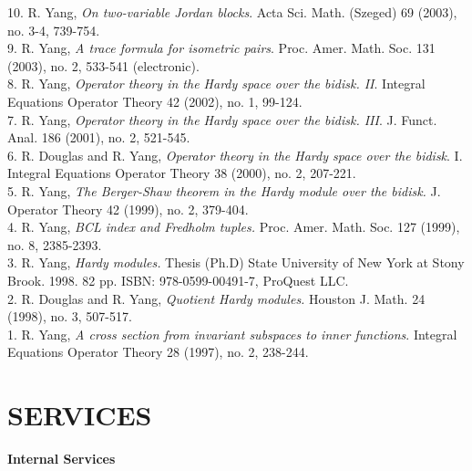 \documentclass[12pt]{res} %
\begin{document}
\begin{resume}
10. R. Yang, {\em On two-variable Jordan blocks}. Acta Sci. Math. (Szeged) 69 (2003), no. 3-4, 739-754.\\
9. R. Yang, {\em A trace formula for isometric pairs}. Proc. Amer. Math. Soc. 131 (2003), no. 2, 533-541 (electronic).\\
8. R. Yang, {\em Operator theory in the Hardy space over the bidisk. II}. Integral Equations Operator Theory 42 (2002), no. 1, 99-124.\\
7. R. Yang, {\em Operator theory in the Hardy space over the bidisk. III}. J. Funct. Anal. 186 (2001), no. 2, 521-545.\\
6. R. Douglas and {R. Yang}, {\em Operator theory in the Hardy space over the bidisk}. I. Integral Equations Operator Theory 38 (2000), no. 2, 207-221.\\
5. R. Yang, {\em The Berger-Shaw theorem in the Hardy module over the bidisk.} J. Operator Theory 42 (1999), no. 2, 379-404.\\
4. R. Yang, {\em BCL index and Fredholm tuples.} Proc. Amer. Math. Soc. 127 (1999), no. 8, 2385-2393.\\
3. R. Yang, {\em Hardy modules.} Thesis (Ph.D) State University of New York at Stony Brook. 1998. 82 pp. ISBN: 978-0599-00491-7, ProQuest LLC.\\
2. R. Douglas and {R. Yang}, {\em Quotient Hardy modules.} Houston J. Math. 24 (1998), no. 3, 507-517.\\
1. R. Yang, {\em A cross section from invariant subspaces to inner functions}. Integral Equations Operator Theory 28 (1997), no. 2, 238-244.

                                                                               
\section{SERVICES}

\vspace{5mm} 

\textbf{Internal Services}


\end{resume}
\end{document}
